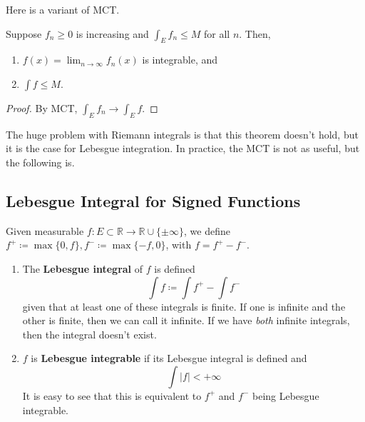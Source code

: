   Here is a variant of MCT. 

  \begin{lemma}
    \label{thm:levis-lemma}
 
    Suppose $f_n \geq 0$ is increasing and $\int_E f_n \leq M$ for all $n$. Then, 
    \begin{enumerate}
      \item $f(x) = \lim_{n \to \infty} f_n (x)$ is integrable, and 
      \item $\int f \leq M$. 
    \end{enumerate}
  \end{lemma}
  \begin{proof}
    By MCT, $\int_E f_n \to \int_E f$. 
  \end{proof} 

  The huge problem with Riemann integrals is that this theorem doesn't hold, but it is the case for Lebesgue integration. In practice, the MCT is not as useful, but the following is. 

\subsection{Lebesgue Integral for Signed Functions} 

  \begin{definition}
    \label{def:leb-int-signed}
    Given measurable $f: E \subset \mathbb{R} \to \mathbb{R} \cup \{\pm \infty\}$, we define $f^+ \coloneqq \max \{0, f\}, f^- \coloneqq \max\{-f, 0\}$, with $f = f^+ - f^-$. 
    \begin{enumerate}
      \item The \textbf{Lebesgue integral} of $f$ is defined
        \begin{equation}
          \int f \coloneqq \int f^+ - \int f^- 
        \end{equation}
        given that at least one of these integrals is finite. If one is infinite and the other is finite, then we can call it infinite. If we have \textit{both} infinite integrals, then the integral doesn't exist. 

      \item $f$ is \textbf{Lebesgue integrable} if its Lebesgue integral is defined and 
        \begin{equation}
          \int |f| < +\infty 
        \end{equation}
        It is easy to see that this is equivalent to $f^+$ and $f^-$ being Lebesgue integrable. 
    \end{enumerate}
  \end{definition} 

